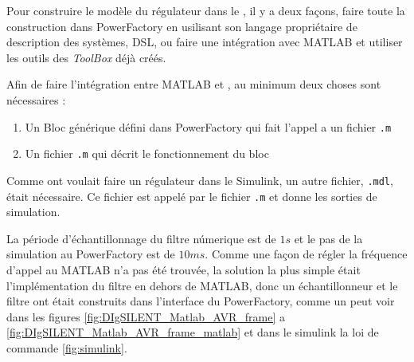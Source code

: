 Pour construire le modèle du régulateur dans le \powerfactory, il y a deux façons, faire toute la construction dans PowerFactory en usilisant son langage propriétaire de description des systèmes, \gls{DSL},  ou faire une intégration avec MATLAB et utiliser les outils des \textit{ToolBox} déjà créés.

Afin de faire l'intégration entre MATLAB et \powerfactory, au minimum deux choses sont nécessaires :
\begin{enumerate}
	\item Un Bloc générique défini dans PowerFactory qui fait l'appel a un fichier \verb|.m|
	\item Un fichier \verb|.m| qui décrit le fonctionnement du bloc
	
\end{enumerate}

Comme ont voulait faire un régulateur dans le Simulink, un autre fichier, \verb|.mdl|, était nécessaire. Ce fichier est appelé par le fichier \verb|.m| et donne les sorties de simulation.

La période d'échantillonnage du filtre númerique est de $ 1s $ et le pas de la simulation au PowerFactory est de $ 10ms $. Comme une façon de régler la fréquence d'appel au MATLAB n'a pas été trouvée, la solution la plus simple était l'implémentation du filtre en dehors de MATLAB, donc un échantillonneur et le filtre ont était construits dans l'interface du PowerFactory, comme un peut voir dans les figures \ref{fig:DIgSILENT_Matlab_AVR_frame} a \ref{fig:DIgSILENT_Matlab_AVR_frame_matlab} et dans le simulink la loi de commande \ref{fig:simulink}.

